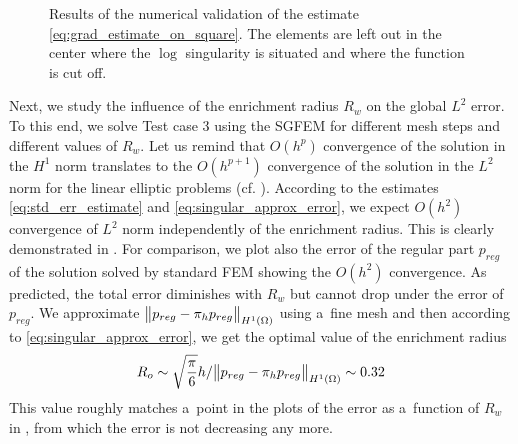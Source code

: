 %
\begin{figure}[!htb]
  \centering    
  \hspace{0pt}
  \caption[Log error estimate.]
  {
  Results of the numerical validation of the estimate \eqref{eq:grad_estimate_on_square}. The elements are left out 
  in the center where the $\log$ singularity is situated and where the function is cut off.
  }
  \label{fig:log_estimate}
\end{figure}
%


Next, we study the influence of the enrichment radius $R_w$ on the global $L^2$ error. To this end, we solve Test case 3
using the SGFEM for different mesh steps and different values of $R_w$.
Let us remind that $O(h^p)$ convergence of the solution in the $H^1$ norm translates to the $O(h^{p+1})$ convergence of the solution in the $L^2$ norm 
for the linear elliptic problems (cf. \cite[Theorem 19.2]{ciarlet_basic_1991}). According to the estimates \eqref{eq:std_err_estimate}
and \eqref{eq:singular_approx_error}, we expect $O(h^2)$ convergence of $L^2$ norm independently of the enrichment radius. This is 
clearly demonstrated in . For comparison, we plot also the error of the regular part $p_{reg}$ of the solution
solved by standard FEM showing the $O(h^2)$ convergence.
As predicted, the total error diminishes with $R_w$ but cannot 
drop under the error of $p_{reg}$. We approximate $\bigl\Vert p_{reg} - \pi_h p_{reg}\bigr\Vert_{H^1(\Omega)}$
using a~fine mesh and then according to \eqref{eq:singular_approx_error},
we get the optimal value of the enrichment radius
\[
    R_o \sim \sqrt{\frac{\pi}{6}} h/\bigl\Vert p_{reg} - \pi_h p_{reg}\bigr\Vert_{H^1(\Omega)} \sim 0.32
\]
This value roughly matches a~point in the plots of the error as a~function of $R_w$ in
, from which the error is not decreasing any more.


